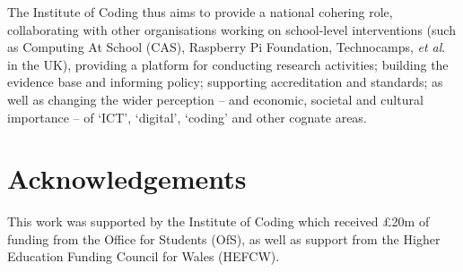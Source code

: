 \documentclass[sigconf,anonymous]{acmart}
\begin{document}
The Institute of Coding thus aims to provide a national cohering role,
collaborating with other organisations working on school-level
interventions (such as Computing At School (CAS), Raspberry Pi
Foundation, Technocamps, {\it et al\/}. in the UK), providing a
platform for conducting research activities; building the evidence
base and informing policy; supporting accreditation and standards; as
well as changing the wider perception -- and economic, societal and
cultural importance -- of `ICT', `digital', `coding' and other cognate
areas.

\section*{Acknowledgements}

This work was supported by the Institute of Coding which received
\pounds20m of funding from the Office for Students (OfS), as well as
support from the Higher Education Funding Council for Wales (HEFCW).
\ifanon
\fi


 
\end{document}

